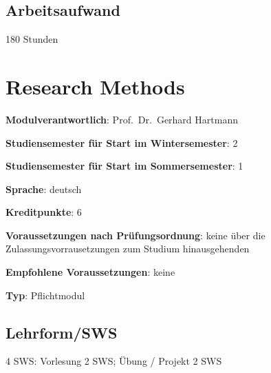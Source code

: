 \section*{Arbeitsaufwand\label{/mi-2017/modulbeschreibungen-master/MA_All_Modul_Wahlpflichtmodule}}\label{arbeitsaufwandpathlabelmi-2017modulbeschreibungen-mastermaux5fallux5fmodulux5fwahlpflichtmodule}

180 Stunden

\chapter{Research
Methods\label{/mi-2017/modulbeschreibungen-master/MA_All_Research_Methods}}\label{research-methodspathlabelmi-2017modulbeschreibungen-mastermaux5fallux5fresearchux5fmethods}

\begin{modulHead}
\textbf{Modulverantwortlich}: Prof.~Dr.~Gerhard
Hartmann
\end{modulHead}
\begin{modulHead}
\textbf{Studiensemester für
Start im Wintersemester}:
2
\end{modulHead}
\begin{modulHead}
\textbf{Studiensemester für Start
im Sommersemester}:
1
\end{modulHead}
\begin{modulHead}
\textbf{Sprache}:
deutsch
\end{modulHead}
\begin{modulHead}
\textbf{Kreditpunkte}:
6
\end{modulHead}
\begin{modulHead}
\textbf{Voraussetzungen nach
Prüfungsordnung}: keine über die Zulassungsvorrausetzungen zum Studium
hinausgehenden
\end{modulHead}
\begin{modulHead}
\textbf{Empfohlene
Voraussetzungen}: keine
\end{modulHead}
\begin{modulHead}
\textbf{Typ}:
Pflichtmodul
\end{modulHead}


\section*{Lehrform/SWS\label{/mi-2017/modulbeschreibungen-master/MA_All_Research_Methods}}\label{lehrformswspathlabelmi-2017modulbeschreibungen-mastermaux5fallux5fresearchux5fmethods}

4 SWS: Vorlesung 2 SWS; Übung / Projekt 2 SWS

